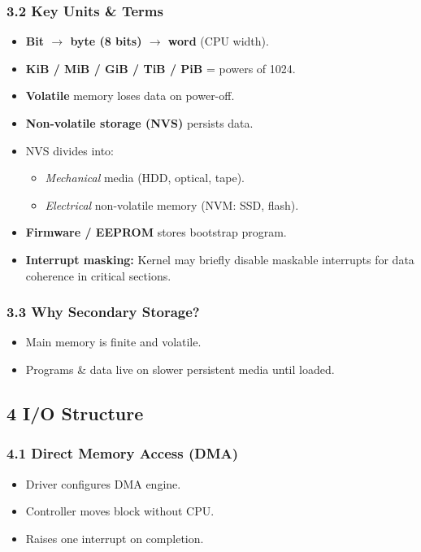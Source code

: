 \documentclass{article}
\begin{document}
\subsubsection*{3.2 Key Units \& Terms}
\begin{itemize}
    \item \textbf{Bit $\rightarrow$ byte (8 bits) $\rightarrow$ word} (CPU width).
    \item \textbf{KiB / MiB / GiB / TiB / PiB} = powers of 1024.
    \item \textbf{Volatile} memory loses data on power-off.
    \item \textbf{Non-volatile storage (NVS)} persists data.
    \item NVS divides into:
    \begin{itemize}
        \item \emph{Mechanical} media (HDD, optical, tape).
        \item \emph{Electrical} non-volatile memory (NVM: SSD, flash).
    \end{itemize}
    \item \textbf{Firmware / EEPROM} stores bootstrap program.
    \item \textbf{Interrupt masking:} Kernel may briefly disable maskable interrupts for data coherence in critical sections.
\end{itemize}

\subsubsection*{3.3 Why Secondary Storage?}
\begin{itemize}
    \item Main memory is finite and volatile.
    \item Programs \& data live on slower persistent media until loaded.
\end{itemize}

\subsection*{4 I/O Structure}
\subsubsection*{4.1 Direct Memory Access (DMA)}
\begin{itemize}
    \item Driver configures DMA engine.
    \item Controller moves block without CPU.
    \item Raises one interrupt on completion.
\end{itemize}
\end{document}

